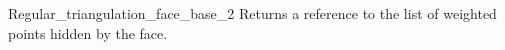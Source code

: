 \begin{ccRefConcept}{Regular_triangulation_face_base_2}
{Returns a reference to the list of weighted points
hidden by the face.}


\ccHasModels



\end{ccRefConcept}


